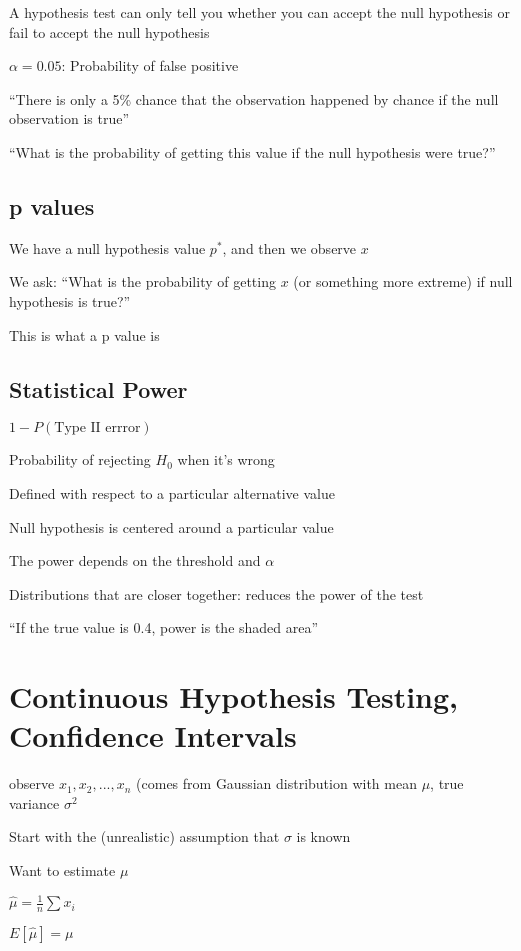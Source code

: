 \documentclass[twoside]{article}
\begin{document}
A hypothesis test can only tell you whether you can accept the null hypothesis or fail to accept the null hypothesis

$\alpha=0.05$: Probability of false positive

``There is only a 5\% chance that the observation happened by chance if the null observation is true''

``What is the probability of getting this value if the null hypothesis were true?''

\subsection{p values}

We have a null hypothesis value $p^*$, and then we observe $x$

We ask: ``What is the probability of getting $x$ (or something more extreme) if null hypothesis is true?''

This is what a p value is

\subsection{Statistical Power}

$1 - P(\text{Type II errror})$

Probability of rejecting $H_0$ when it's wrong

Defined with respect to a particular alternative value

Null hypothesis is centered around a particular value

The power depends on the threshold and $\alpha$

Distributions that are closer together: reduces the power of the test

``If the true value is 0.4, power is the shaded area''

\section{Continuous Hypothesis Testing, Confidence Intervals}

observe $x_1, x_2, ... , x_n$ (comes from Gaussian distribution with mean $\mu$, true variance $\sigma^2$

Start with the (unrealistic) assumption that $\sigma$ is known 

Want to estimate $\mu$

$\hat{\mu} = \frac{1}{n} \sum x_i$

$E[\hat{\mu}] = \mu$
\end{document}

